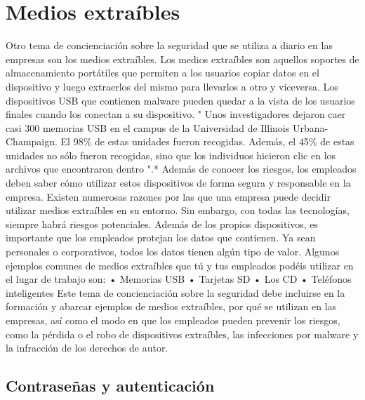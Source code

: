 \documentclass[
]{article}
\begin{document}
\hypertarget{medios-extrauxedbles}{%
\section{Medios extraíbles}\label{medios-extrauxedbles}}

Otro tema de concienciación sobre la seguridad que se utiliza a diario en las empresas son los medios extraíbles. Los medios extraíbles son aquellos soportes de almacenamiento portátiles que permiten a los usuarios copiar datos en el dispositivo y luego extraerlos del mismo para llevarlos a otro y viceversa. Los dispositivos USB que contienen malware pueden quedar a la vista de los usuarios finales cuando los conectan a su dispositivo.
" Unos investigadores dejaron caer casi 300 memorias USB en el campus de la Universidad de Illinois Urbana-Champaign. El 98\% de estas unidades fueron recogidas. Además, el 45\% de estas unidades no sólo fueron recogidas, sino que los individuos hicieron clic en los archivos que encontraron dentro ".*
Además de conocer los riesgos, los empleados deben saber cómo utilizar estos dispositivos de forma segura y responsable en la empresa. Existen numerosas razones por las que una empresa puede decidir utilizar medios extraíbles en su entorno. Sin embargo, con todas las tecnologías, siempre habrá riesgos potenciales. Además de los propios dispositivos, es importante que los empleados protejan los datos que contienen. Ya sean personales o corporativos, todos los datos tienen algún tipo de valor.
Algunos ejemplos comunes de medios extraíbles que tú y tus empleados podéis utilizar en el lugar de trabajo son:
• Memorias USB
• Tarjetas SD
• Los CD
• Teléfonos inteligentes
Este tema de concienciación sobre la seguridad debe incluirse en la formación y abarcar ejemplos de medios extraíbles, por qué se utilizan en las empresas, así como el modo en que los empleados pueden prevenir los riesgos, como la pérdida o el robo de dispositivos extraíbles, las infecciones por malware y la infracción de los derechos de autor.

\hypertarget{contraseuxf1as-y-autenticaciuxf3n}{%
\subsection{Contraseñas y autenticación}\label{contraseuxf1as-y-autenticaciuxf3n}}
\end{document}
